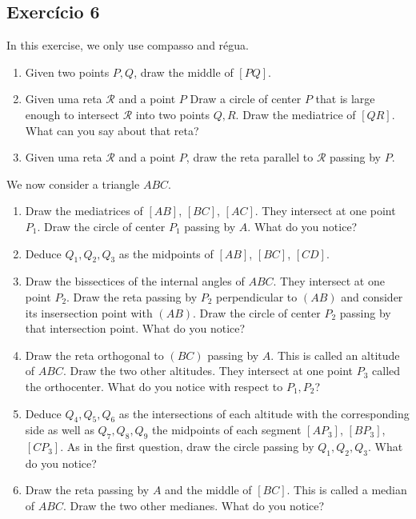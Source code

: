 \subsection*{Exercício 6}

In this exercise, we only use compasso and régua.

\begin{enumerate}
\item Given two points $P,Q$, draw the middle of $[PQ]$.
\item Given uma reta $\mathcal{R}$ and a point $P$
  Draw a circle of center $P$ that is large enough to intersect
  $\mathcal{R}$ into two points $Q,R$. Draw the mediatrice of $[QR]$. What
  can you say about that reta?
\item Given uma reta $\mathcal{R}$ and a point $P$, draw the reta parallel
  to $\mathcal{R}$ passing by $P$.
\end{enumerate}

We now consider a triangle $ABC$.

\begin{enumerate}
\item Draw the mediatrices of $[AB]$, $[BC]$, $[AC]$.
  They intersect at one point $P_1$. Draw the circle of center $P_1$ passing
  by $A$. What do you notice?
\item Deduce $Q_1,Q_2,Q_3$ as the midpoints of $[AB]$, $[BC]$, $[CD]$.
\item Draw the bissectices of the internal angles of $ABC$. They intersect at
  one point $P_2$. Draw the reta passing by $P_2$ perpendicular to $(AB)$ and
  consider its insersection point with $(AB)$.
  Draw the circle of center $P_2$ passing by that intersection point.
  What do you notice?
\item Draw the reta orthogonal to $(BC)$ passing by $A$. This
  is called an altitude of $ABC$. Draw the two other altitudes. They intersect
  at one point $P_3$ called the orthocenter. What do you notice with respect
  to $P_1,P_2$?
\item Deduce $Q_4,Q_5,Q_6$ as the intersections of each altitude
  with the corresponding side as well as $Q_7,Q_8,Q_9$ the midpoints of each
  segment $[AP_3]$, $[BP_3]$, $[CP_3]$.
  As in the first question, draw the circle passing by $Q_1,Q_2,Q_3$.
  What do you notice?
\item Draw the reta passing by $A$ and the middle of $[BC]$. This is called
  a median of $ABC$. Draw the two other medianes. What do you notice?
\end{enumerate}
  
